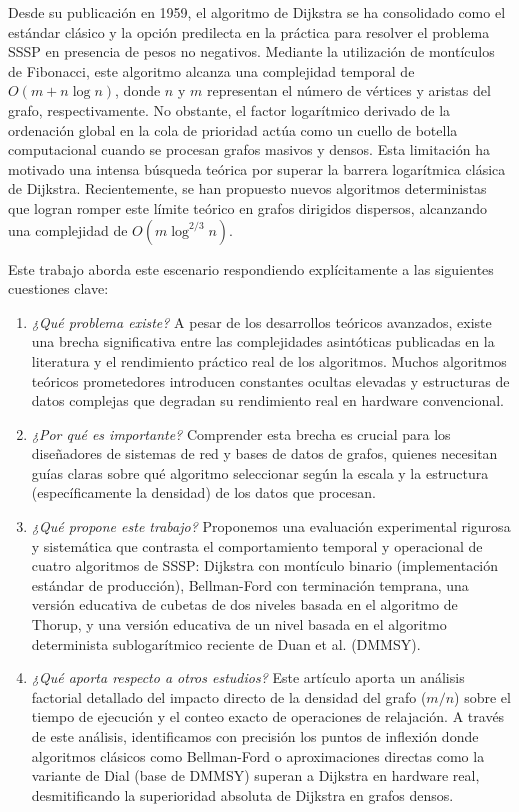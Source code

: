 \documentclass[conference]{IEEEtran}
\begin{document}
Desde su publicación en 1959, el algoritmo de Dijkstra se ha consolidado como el estándar clásico y la opción predilecta en la práctica para resolver el problema SSSP en presencia de pesos no negativos. Mediante la utilización de montículos de Fibonacci, este algoritmo alcanza una complejidad temporal de $O(m + n \log n)$, donde $n$ y $m$ representan el número de vértices y aristas del grafo, respectivamente. No obstante, el factor logarítmico derivado de la ordenación global en la cola de prioridad actúa como un cuello de botella computacional cuando se procesan grafos masivos y densos. Esta limitación ha motivado una intensa búsqueda teórica por superar la barrera logarítmica clásica de Dijkstra. Recientemente, se han propuesto nuevos algoritmos deterministas que logran romper este límite teórico en grafos dirigidos dispersos, alcanzando una complejidad de $O(m \log^{2/3} n)$.

Este trabajo aborda este escenario respondiendo explícitamente a las siguientes cuestiones clave:
\begin{enumerate}
    \item \textit{¿Qué problema existe?} A pesar de los desarrollos teóricos avanzados, existe una brecha significativa entre las complejidades asintóticas publicadas en la literatura y el rendimiento práctico real de los algoritmos. Muchos algoritmos teóricos prometedores introducen constantes ocultas elevadas y estructuras de datos complejas que degradan su rendimiento real en hardware convencional.
    \item \textit{¿Por qué es importante?} Comprender esta brecha es crucial para los diseñadores de sistemas de red y bases de datos de grafos, quienes necesitan guías claras sobre qué algoritmo seleccionar según la escala y la estructura (específicamente la densidad) de los datos que procesan.
    \item \textit{¿Qué propone este trabajo?} Proponemos una evaluación experimental rigurosa y sistemática que contrasta el comportamiento temporal y operacional de cuatro algoritmos de SSSP: Dijkstra con montículo binario (implementación estándar de producción), Bellman-Ford con terminación temprana, una versión educativa de cubetas de dos niveles basada en el algoritmo de Thorup, y una versión educativa de un nivel basada en el algoritmo determinista sublogarítmico reciente de Duan et al. (DMMSY).
    \item \textit{¿Qué aporta respecto a otros estudios?} Este artículo aporta un análisis factorial detallado del impacto directo de la densidad del grafo ($m/n$) sobre el tiempo de ejecución y el conteo exacto de operaciones de relajación. A través de este análisis, identificamos con precisión los puntos de inflexión donde algoritmos clásicos como Bellman-Ford o aproximaciones directas como la variante de Dial (base de DMMSY) superan a Dijkstra en hardware real, desmitificando la superioridad absoluta de Dijkstra en grafos densos.
\end{enumerate}
\end{document}
